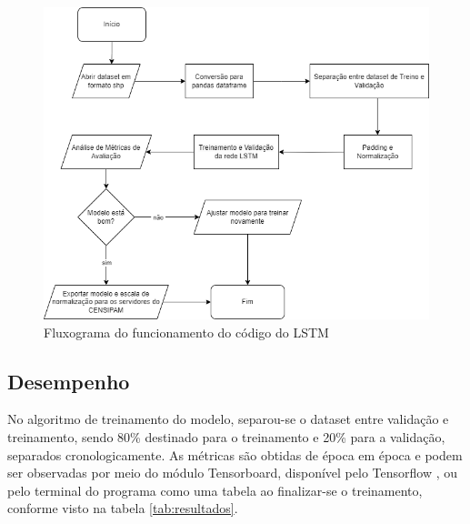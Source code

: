 \begin{figure}[H]
	\centering
	\begin{minipage}{0.98\linewidth}
		\centering
		\includegraphics[scale=0.6]{tg1/figuras/flstm_flowchart.png}
		\caption{Fluxograma do funcionamento do código do LSTM} \label{fig:lstm_flowchart}
	\end{minipage}
\end{figure}

\subsection{Desempenho}

No algoritmo de treinamento do modelo, separou-se o dataset entre validação e treinamento, sendo 80\% destinado para o treinamento e 20\% para a validação, separados cronologicamente. As métricas são obtidas de época em época e podem ser observadas por meio do módulo Tensorboard, disponível pelo Tensorflow \cite{tensorflow2015-whitepaper}, ou pelo terminal do programa como uma tabela ao finalizar-se o treinamento, conforme visto na tabela \ref{tab:resultados}.



